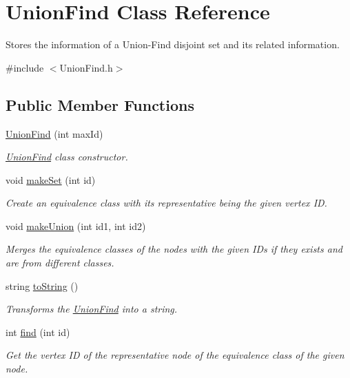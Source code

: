 \hypertarget{classUnionFind}{}\section{Union\+Find Class Reference}
\label{classUnionFind}


Stores the information of a Union-\/\+Find disjoint set and its related information.  




{\ttfamily \#include $<$Union\+Find.\+h$>$}

\subsection*{Public Member Functions}
\begin{DoxyCompactItemize}
\item 
\hyperlink{classUnionFind_ad36f529ec0f1e7414e164bf1071bc87c}{Union\+Find} (int max\+Id)
\begin{DoxyCompactList}\small\item\em \hyperlink{classUnionFind}{Union\+Find} class constructor. \end{DoxyCompactList}\item 
void \hyperlink{classUnionFind_ac1bd057d6b8d5a834650c29677d99c98}{make\+Set} (int id)
\begin{DoxyCompactList}\small\item\em Create an equivalence class with its representative being the given vertex ID. \end{DoxyCompactList}\item 
void \hyperlink{classUnionFind_a4ebd8dadae9c2be54bc474af93ce3b80}{make\+Union} (int id1, int id2)
\begin{DoxyCompactList}\small\item\em Merges the equivalence classes of the nodes with the given I\+Ds if they exists and are from different classes. \end{DoxyCompactList}\item 
string \hyperlink{classUnionFind_a745c39dc529d7fd20536bed4ceeca069}{to\+String} ()
\begin{DoxyCompactList}\small\item\em Transforms the \hyperlink{classUnionFind}{Union\+Find} into a string. \end{DoxyCompactList}\item 
int \hyperlink{classUnionFind_af3c7274809f59f8b734ded45c17d6830}{find} (int id)
\begin{DoxyCompactList}\small\item\em Get the vertex ID of the representative node of the equivalence class of the given node. \end{DoxyCompactList}\item 

\end{DoxyCompactItemize}
